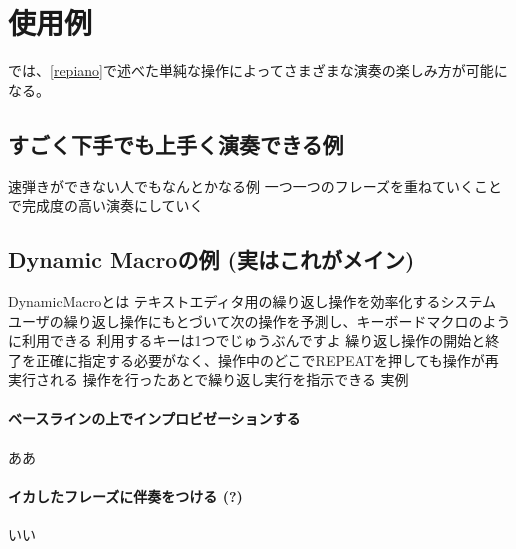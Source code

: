 \section{{\system}使用例}

{\system}では、\ref{repiano}で述べた単純な操作によってさまざまな演奏の楽しみ方が可能になる。

\subsection{すごく下手でも上手く演奏できる例}
速弾きができない人でもなんとかなる例
一つ一つのフレーズを重ねていくことで完成度の高い演奏にしていく

\subsection{Dynamic Macroの例 (実はこれがメイン)}
DynamicMacroとは
テキストエディタ用の繰り返し操作を効率化するシステム
ユーザの繰り返し操作にもとづいて次の操作を予測し、キーボードマクロのように利用できる
利用するキーは1つでじゅうぶんですよ
繰り返し操作の開始と終了を正確に指定する必要がなく、操作中のどこでREPEATを押しても操作が再実行される
操作を行ったあとで繰り返し実行を指示できる
実例
\paragraph*{ベースラインの上でインプロビゼーションする}
ああ
\paragraph*{イカしたフレーズに伴奏をつける (?)}
いい
